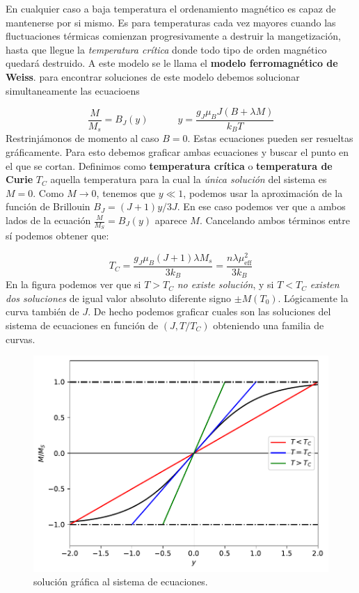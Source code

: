 \documentclass[12pt,a4paper]{book}
\numberwithin{equation}{section}
\numberwithin{figure}{section}
\newcommand{\tquad}{\quad \quad \quad}
\newcommand{\eff}{\mathrm{eff}}
\begin{document}
En cualquier caso a baja temperatura el ordenamiento magnético es capaz de mantenerse por si mismo. Es para temperaturas cada vez mayores cuando las fluctuaciones térmicas comienzan progresivamente a destruir la mangetización, hasta que llegue la \textit{temperatura crítica} donde todo tipo de orden magnético quedará destruido. A este modelo se le llama el \textbf{modelo ferromagnético de Weiss}. para encontrar soluciones de este modelo debemos solucionar simultaneamente las ecuacioens 

\begin{equation}
    \frac{M}{M_s} = B_J (y) \tquad y = \frac{g_J \mu_B J (B+\lambda M)}{k_B T} \label{Ec:05-01-005}
\end{equation}
Restrinjámonos de momento al caso $B=0$. Estas ecuaciones pueden ser resueltas gráficamente. Para esto debemos graficar ambas ecuaciones y buscar el punto en el que se cortan. Definimos como \textbf{temperatura crítica} o \textbf{temperatura de Curie} $T_C$ aquella temperatura para la cual la \textit{única solución} del sistema es $M=0$. Como $M\rightarrow0$, tenemos que $y\ll 1$, podemos usar la aproximación de la función de Brillouin $B_J = (J+1)y/3J$. En ese caso podemos ver que a ambos lados de la ecuación $\frac{M}{M_S}=B_J(y)$ aparece $M$. Cancelando ambos términos entre sí podemos obtener  que:

\begin{equation}
    T_C= \frac{g_J \mu_B (J+1) \lambda M_s}{3 k_B} = \frac{n \lambda \mu_\eff^2}{3 k_B}
\end{equation}
En la figura podemos ver que si $T>T_C$ \textit{no existe solución}, y si $T<T_C$ \textit{existen dos soluciones} de igual valor absoluto diferente signo $\pm M(T_0)$. Lógicamente la curva también de $J$. De hecho podemos graficar cuales son las soluciones del sistema de ecuaciones en función de $(J,T/T_C)$ obteniendo una familia de curvas. \\

\begin{figure}[h!]
    \centering
    \includegraphics[scale=1]{Imagenes/05-TC.pdf}
    \caption{solución gráfica al sistema de ecuaciones.}
    \label{Fig:05-01-01}
\end{figure}
\end{document}
